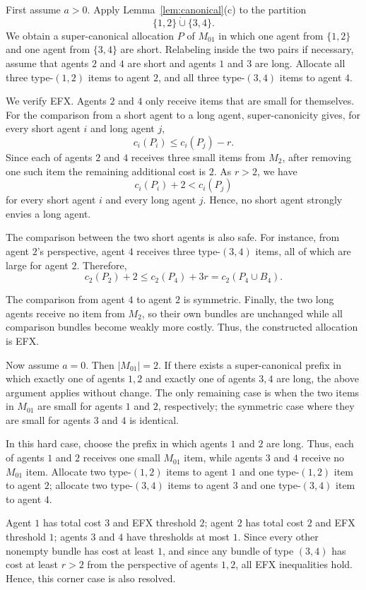 \documentclass{article}
\theoremstyle{definition}
\begin{document}
First assume $a>0$.  Apply Lemma~\ref{lem:canonical}(c) to the partition
\[
    \{1,2\}\mathbin{\dot\cup}\{3,4\}.
\]
We obtain a super-canonical allocation $P$ of $M_{01}$ in which one agent from
$\{1,2\}$ and one agent from $\{3,4\}$ are short.  Relabeling inside the two
pairs if necessary, assume that agents $2$ and $4$ are short and agents $1$
and $3$ are long.  Allocate all three type-$(1,2)$ items to agent $2$, and all
three type-$(3,4)$ items to agent $4$.

We verify EFX.  Agents $2$ and $4$ only receive items that are small for
themselves.  For the comparison from a short agent to a long agent,
super-canonicity gives, for every short agent $i$ and long agent $j$,
\[
    c_i(P_i)\le c_i(P_j)-r.
\]
Since each of agents $2$ and $4$ receives three small items from $M_2$, after
removing one such item the remaining additional cost is $2$.  As $r>2$, we
have
\[
    c_i(P_i)+2 < c_i(P_j)
\]
for every short agent $i$ and every long agent $j$.  Hence, no short agent
strongly envies a long agent.

The comparison between the two short agents is also safe.  For instance, from
agent $2$'s perspective, agent $4$ receives three type-$(3,4)$ items, all of
which are large for agent $2$.  Therefore,
\[
    c_2(P_2)+2
    \le c_2(P_4)+3r
    = c_2(P_4\cup B_4).
\]

The comparison from agent $4$ to agent $2$ is
symmetric.  Finally, the two long agents receive no item from $M_2$, so their
own bundles are unchanged while all comparison bundles become weakly more
costly.  Thus, the constructed allocation is EFX.

Now assume $a=0$.  Then $|M_{01}|=2$.  If there exists a super-canonical
prefix in which exactly one of agents $1,2$ and exactly one of agents $3,4$
are long, the above argument applies without change.  The only remaining
case is when the two items in $M_{01}$ are small for agents $1$ and $2$,
respectively; the symmetric case where they are small for agents $3$ and $4$
is identical.

In this hard case, choose the prefix in which agents $1$ and $2$ are long.
Thus, each of agents $1$ and $2$ receives one small $M_{01}$ item, while agents
$3$ and $4$ receive no $M_{01}$ item.  Allocate two type-$(1,2)$ items to
agent $1$ and one type-$(1,2)$ item to agent $2$; allocate two type-$(3,4)$
items to agent $3$ and one type-$(3,4)$ item to agent $4$.

Agent $1$ has total cost $3$ and
EFX threshold $2$; agent $2$ has total cost $2$ and EFX threshold $1$; agents
$3$ and $4$ have thresholds at most $1$.  Since every other nonempty bundle
has cost at least $1$, and since any bundle of type $(3,4)$ has cost at least
$r>2$ from the perspective of agents $1,2$, all EFX inequalities hold.  Hence,
this corner case is also resolved.
\end{document}
